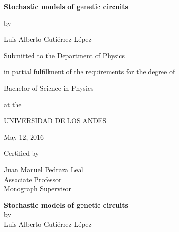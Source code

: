 \documentclass[12pt,letterpaper,twoside,openright]{report}
\begin{document}
\begin{titlepage}
	\centering \large
	{\Large \bf Stochastic models of genetic circuits\par}
        \vspace{0.3cm}
        {by\par}
        \vspace{0.3cm}
	{\Large Luis Alberto Guti\'errez L\'opez \par}
        \vspace{2cm}
        {
	{Submitted to the Department of Physics\par}
        {in partial fulfillment of the requirements for the degree of \par}}
        \vspace{.25cm}
	{Bachelor of Science in Physics\par}
        \vspace{.25cm}
        {at the\par}
        \vspace{.25cm}
        {UNIVERSIDAD DE LOS ANDES\par}
        \vspace{.25cm}
        {May 12, 2016}

        \vspace{1.8cm}

        
        \vspace{1.2cm}

        Certified by \dotfill \par
        \raggedleft Juan Manuel Pedraza Leal \\ Associate Professor \\ Monograph Supervisor
	\vfill
\end{titlepage}

\cleardoublepage

\begin{center}

{\large \bf Stochastic models of genetic circuits} \\
by \\
{\large Luis Alberto Guti\'errez L\'opez}

\vspace{1.0cm}

\end{center}
\par
\end{document}
